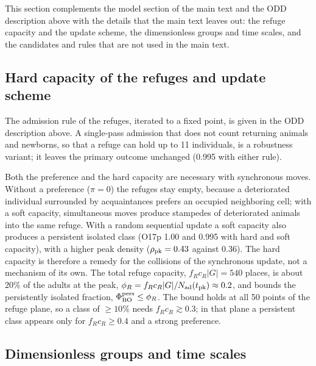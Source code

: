 This section complements the model section of the main text and the ODD description above with the details that
the main text leaves out: the refuge capacity and the update scheme, the dimensionless groups and time scales, and
the candidates and rules that are not used in the main text.

\subsection{Hard capacity of the refuges and update scheme}
\label{sm:model-capacity}

The admission rule of the refuges, iterated to a fixed point, is given in the ODD description above. A single-pass
admission that does not count returning animals and newborns, so that a refuge can hold up to 11 individuals, is a
robustness variant; it leaves the primary outcome unchanged (0.995 with either rule).

Both the preference and the hard capacity are necessary with synchronous moves. Without a preference ($\pi=0$) the
refuges stay empty, because a deteriorated individual surrounded by acquaintances prefers an occupied neighboring
cell; with a soft capacity, simultaneous moves produce stampedes of deteriorated animals into the same refuge. With a
random sequential update a soft capacity also produces a persistent isolated class (O17p 1.00 and 0.995 with hard and
soft capacity), with a higher peak density ($\rho_{\rm pk}=0.43$ against 0.36). The hard capacity is therefore a
remedy for the collisions of the synchronous update, not a mechanism of its own. The total refuge capacity,
$f_Rc_R|G|=540$ places, is about 20\% of the adults at the peak, $\phi_R=f_Rc_R|G|/N_{\rm ad}(t_{\rm pk})\approx0.2$,
and bounds the persistently isolated fraction, $\Phi_{\rm BO}^{\rm pers}\le\phi_R$. The bound holds at all 50 points
of the refuge plane, so a class of $\ge10\%$ needs $f_Rc_R\gtrsim0.3$; in that plane a persistent class appears only
for $f_Rc_R\ge0.4$ and a strong preference.

\subsection{Dimensionless groups and time scales}
\label{sm:model-scales}

